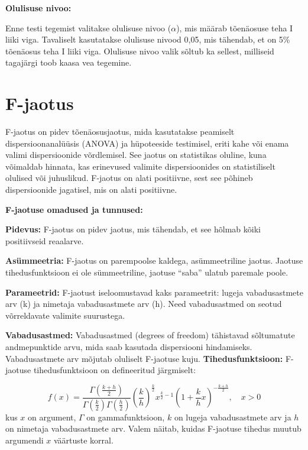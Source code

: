 \documentclass[
]{book}
\begin{document}
\textbf{Olulisuse nivoo:}

Enne testi tegemist valitakse olulisuse nivoo (\(\alpha\)), mis määrab tõenäosuse teha I liiki viga. Tavaliselt kasutatakse olulisuse nivood 0,05, mis tähendab, et on 5\% tõenäosus teha I liiki viga. Olulisuse nivoo valik sõltub ka sellest, milliseid tagajärgi toob kaasa vea tegemine.

\section{F-jaotus}\label{f-jaotus}

F-jaotus on pidev tõenäosusjaotus, mida kasutatakse peamiselt dispersioonanalüüsis (ANOVA) ja hüpoteeside testimisel, eriti kahe või enama valimi dispersioonide võrdlemisel. See jaotus on statistikas oluline, kuna võimaldab hinnata, kas erinevused valimite dispersioonides on statistiliselt olulised või juhuslikud. F-jaotus on alati positiivne, sest see põhineb dispersioonide jagatisel, mis on alati positiivne.

\textbf{F-jaotuse omadused ja tunnused:}

\textbf{Pidevus:} F-jaotus on pidev jaotus, mis tähendab, et see hõlmab kõiki positiivseid reaalarve.

\textbf{Asümmeetria:} F-jaotus on parempoolse kaldega, asümmeetriline jaotus. Jaotuse tihedusfunktsioon ei ole sümmeetriline, jaotuse ``saba'' ulatub paremale poole.

\textbf{Parameetrid:} F-jaotust iseloomustavad kaks parameetrit: lugeja vabadusastmete arv (k) ja nimetaja vabadusastmete arv (h). Need vabadusastmed on seotud võrreldavate valimite suurustega.

\textbf{Vabadusastmed:} Vabadusastmed (degrees of freedom) tähistavad sõltumatute andmepunktide arvu, mida saab kasutada dispersiooni hindamiseks. Vabadusastmete arv mõjutab oluliselt F-jaotuse kuju.
\textbf{Tihedusfunktsioon:} F-jaotuse tihedusfunktsioon on defineeritud järgmiselt:

\[f(x) = \frac{\Gamma\left(\frac{k + h}{2}\right)}{\Gamma\left(\frac{k}{2}\right) \Gamma\left(\frac{h}{2}\right)} \left(\frac{k}{h}\right)^{\frac{k}{2}} x^{\frac{k}{2} - 1} \left(1 + \frac{k}{h} x\right)^{-\frac{k + h}{2}}, \quad x > 0\]
kus \(x\) on argument, \(\Gamma\) on gammafunktsioon, \(k\) on lugeja vabadusastmete arv ja \(h\) on nimetaja vabadusastmete arv. Valem näitab, kuidas F-jaotuse tihedus muutub argumendi \(x\) väärtuste korral.
\end{document}
